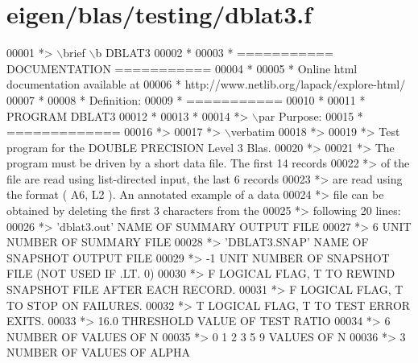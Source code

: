 \hypertarget{eigen_2blas_2testing_2dblat3_8f_source}{}\section{eigen/blas/testing/dblat3.f}
\label{eigen_2blas_2testing_2dblat3_8f_source}

\begin{DoxyCode}
00001 \textcolor{comment}{*> \(\backslash\)brief \(\backslash\)b DBLAT3}
00002 \textcolor{comment}{*}
00003 \textcolor{comment}{*  =========== DOCUMENTATION ===========}
00004 \textcolor{comment}{*}
00005 \textcolor{comment}{* Online html documentation available at }
00006 \textcolor{comment}{*            http://www.netlib.org/lapack/explore-html/ }
00007 \textcolor{comment}{*}
00008 \textcolor{comment}{*  Definition:}
00009 \textcolor{comment}{*  ===========}
00010 \textcolor{comment}{*}
00011 \textcolor{comment}{*       PROGRAM DBLAT3}
00012 \textcolor{comment}{* }
00013 \textcolor{comment}{*}
00014 \textcolor{comment}{*> \(\backslash\)par Purpose:}
00015 \textcolor{comment}{*  =============}
00016 \textcolor{comment}{*>}
00017 \textcolor{comment}{*> \(\backslash\)verbatim}
00018 \textcolor{comment}{*>}
00019 \textcolor{comment}{*> Test program for the DOUBLE PRECISION Level 3 Blas.}
00020 \textcolor{comment}{*>}
00021 \textcolor{comment}{*> The program must be driven by a short data file. The first 14 records}
00022 \textcolor{comment}{*> of the file are read using list-directed input, the last 6 records}
00023 \textcolor{comment}{*> are read using the format ( A6, L2 ). An annotated example of a data}
00024 \textcolor{comment}{*> file can be obtained by deleting the first 3 characters from the}
00025 \textcolor{comment}{*> following 20 lines:}
00026 \textcolor{comment}{*> 'dblat3.out'      NAME OF SUMMARY OUTPUT FILE}
00027 \textcolor{comment}{*> 6                 UNIT NUMBER OF SUMMARY FILE}
00028 \textcolor{comment}{*> 'DBLAT3.SNAP'     NAME OF SNAPSHOT OUTPUT FILE}
00029 \textcolor{comment}{*> -1                UNIT NUMBER OF SNAPSHOT FILE (NOT USED IF .LT. 0)}
00030 \textcolor{comment}{*> F        LOGICAL FLAG, T TO REWIND SNAPSHOT FILE AFTER EACH RECORD.}
00031 \textcolor{comment}{*> F        LOGICAL FLAG, T TO STOP ON FAILURES.}
00032 \textcolor{comment}{*> T        LOGICAL FLAG, T TO TEST ERROR EXITS.}
00033 \textcolor{comment}{*> 16.0     THRESHOLD VALUE OF TEST RATIO}
00034 \textcolor{comment}{*> 6                 NUMBER OF VALUES OF N}
00035 \textcolor{comment}{*> 0 1 2 3 5 9       VALUES OF N}
00036 \textcolor{comment}{*> 3                 NUMBER OF VALUES OF ALPHA}

\end{DoxyCode}
